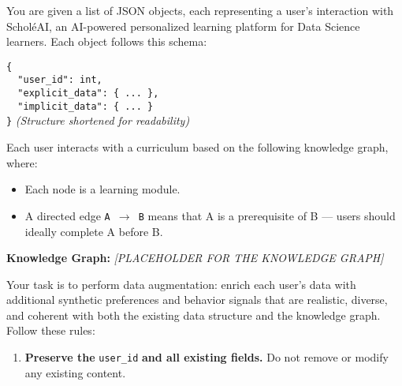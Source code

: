 \begin{tcolorbox}[colback=gray!5!white, colframe=black!60!black, title=Prompt: Data Augmentation]
{\footnotesize
You are given a list of JSON objects, each representing a user’s interaction with Schol\'eAI, an AI-powered personalized learning platform for Data Science learners. Each object follows this schema:

\texttt{\{\\
\ \ "user\_id": int,\\
\ \ "explicit\_data": \{ ... \},\\
\ \ "implicit\_data": \{ ... \}\\
\}} \hfill \textit{(Structure shortened for readability)}

\vspace{0.3cm}

Each user interacts with a curriculum based on the following knowledge graph, where:
\begin{itemize}
  \item Each node is a learning module.
  \item A directed edge \texttt{A $\rightarrow$ B} means that A is a prerequisite of B — users should ideally complete A before B.
\end{itemize}

\vspace{0.3cm}

\textbf{Knowledge Graph:}
\textit{[PLACEHOLDER FOR THE KNOWLEDGE GRAPH]}

\vspace{0.3cm}

Your task is to perform data augmentation: enrich each user's data with additional synthetic preferences and behavior signals that are realistic, diverse, and coherent with both the existing data structure and the knowledge graph. Follow these rules:

\begin{enumerate}
  \item \textbf{Preserve the} \texttt{user\_id} \textbf{and all existing fields.} Do not remove or modify any existing content.


\end{enumerate}}
\end{tcolorbox}
